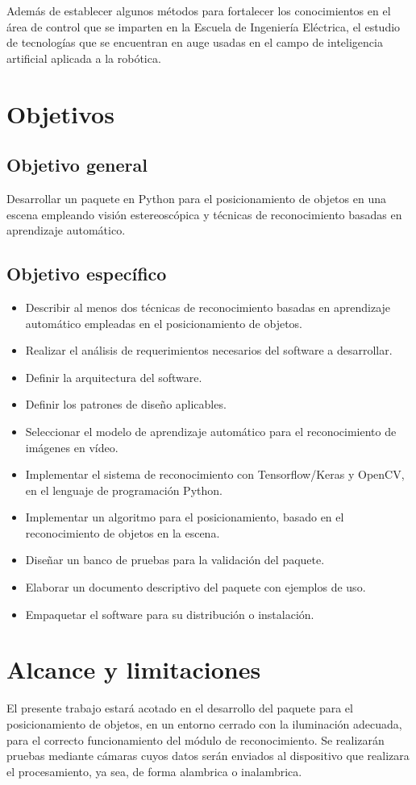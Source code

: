 Además de establecer algunos métodos para fortalecer los conocimientos en el área de control que se imparten en la Escuela de Ingeniería Eléctrica, el estudio de tecnologías que se encuentran en auge usadas en el campo de inteligencia artificial aplicada a la robótica. 
\section{Objetivos}
\subsection{Objetivo general}
Desarrollar un paquete en Python para el posicionamiento de objetos en una escena empleando visión estereoscópica y técnicas de reconocimiento basadas en aprendizaje automático.
\subsection{Objetivo específico}
\begin{itemize}
    \item Describir al menos dos técnicas de reconocimiento basadas en aprendizaje automático empleadas en el posicionamiento de objetos.
    \item Realizar el análisis de requerimientos necesarios del software a desarrollar.
    \item Definir la arquitectura del software.
    \item Definir los patrones de diseño aplicables.
    \item Seleccionar el modelo de aprendizaje automático para el reconocimiento de imágenes en vídeo.
    \item Implementar el sistema de reconocimiento con Tensorflow/Keras y OpenCV, en el lenguaje de programación Python.
    \item Implementar un algoritmo para el posicionamiento, basado en el reconocimiento de objetos en la escena.
    \item Diseñar un banco de pruebas para la validación del paquete.
    \item Elaborar un documento descriptivo del paquete con ejemplos de uso.
    \item Empaquetar el software para su distribución o instalación.
\end{itemize}
\section{Alcance y limitaciones}
El presente trabajo estará acotado en el desarrollo del paquete para el posicionamiento de objetos, en un entorno cerrado con la iluminación adecuada, para el correcto funcionamiento del módulo de reconocimiento. Se realizarán pruebas mediante cámaras cuyos datos serán enviados al dispositivo que realizara el procesamiento, ya sea, de forma alambrica o inalambrica.
